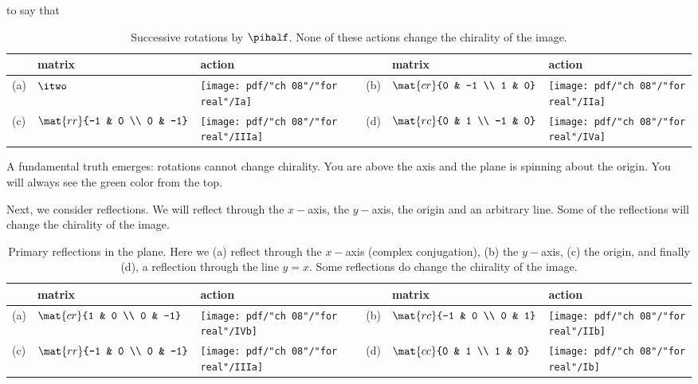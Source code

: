 to say that
\begin{table}[htdp]
\begin{center}
\begin{tabular}{m{0.1in}m{0.75in}m{1.15in}c|m{0.1in}m{0.75in}m{1.15in}}
  & matrix & action & \qquad && matrix & action \\\hline
  (a) & $\itwo$ & \texttt{[image: pdf/"ch 08"/"for real"/Ia]} &&
  (b) & $\mat{cr}{0 & -1 \\ 1 & 0}$ & \texttt{[image: pdf/"ch 08"/"for real"/IIa]} \\[25pt]
  (c) & $\mat{rr}{-1 & 0 \\ 0 & -1}$ & \texttt{[image: pdf/"ch 08"/"for real"/IIIa]} &&
  (d) & $\mat{rc}{0 & 1 \\ -1 & 0}$ & \texttt{[image: pdf/"ch 08"/"for real"/IVa]} \\
\end{tabular}
\end{center}
\label{tab:8:catalog}
\caption[Successive rotations by $\pihalf$]{Successive rotations by $\pihalf$. None of these actions change the chirality of the image.}
\end{table}%
A fundamental truth emerges: rotations cannot change chirality. You are above the axis and the plane is spinning about the origin. You will always see the green color from the top.

Next, we consider reflections. We will reflect through the $x-$axis, the $y-$axis, the origin and an arbitrary line. Some of the reflections will change the chirality of the image.
\begin{table}[htdp]
\begin{center}
\begin{tabular}{m{0.1in}m{0.75in}m{1.15in}c|m{0.1in}m{0.75in}m{1.15in}}
  & matrix & action & \qquad && matrix & action \\\hline
  (a) & $\mat{cr}{1 & 0 \\ 0 & -1}$ & \texttt{[image: pdf/"ch 08"/"for real"/IVb]} &&
  (b) & $\mat{rc}{-1 & 0 \\ 0 & 1}$ & \texttt{[image: pdf/"ch 08"/"for real"/IIb]} \\[25pt]
  (c) & $\mat{rr}{-1 & 0 \\ 0 & -1}$ & \texttt{[image: pdf/"ch 08"/"for real"/IIIa]} &&
  (d) & $\mat{cc}{0 & 1 \\ 1 & 0}$   & \texttt{[image: pdf/"ch 08"/"for real"/Ib]} \\
\end{tabular}
\end{center}
\label{tab:8:reflections}
\caption[Primary reflections in the plane]{Primary reflections in the plane. Here we (a) reflect through the $x-$axis (complex conjugation), (b) the $y-$axis, (c) the origin, and finally (d), a reflection through the line $y=x$. Some reflections do change the chirality of the image.}
\end{table}%

